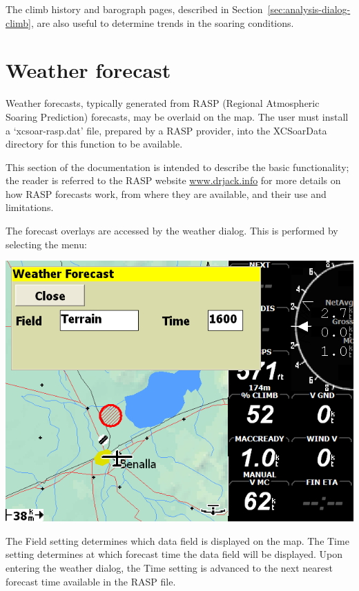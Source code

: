 \documentclass[a4paper,12pt]{refrep}
\begin{document}
The climb history and barograph pages, described in
Section~\ref{sec:analysis-dialog-climb}, are also useful to determine
trends in the soaring conditions.

\section{Weather forecast}

Weather forecasts, typically generated from RASP (Regional Atmospheric
Soaring Prediction) forecasts, may be overlaid on the map.  The user
must install a `xcsoar-rasp.dat' file, prepared by a RASP provider,
into the XCSoarData directory for this function to be available.

This section of the documentation is intended to describe the basic
functionality; the reader is referred to the RASP website
\url{www.drjack.info} for more details on how RASP forecasts work, from where they are available, and their use and limitations.

The forecast overlays are accessed by the weather dialog.  This is
performed by selecting the menu:
\begin{quote}
\blink{}\blink{}
\end{quote}

\begin{center}
\includegraphics[angle=0,width=\linewidth,keepaspectratio='true']{figures/dialog-weather.png}
\end{center}

The Field setting determines which data field is displayed on the map.
The Time setting determines at which forecast time the data field will
be displayed.  Upon entering the weather dialog, the Time setting is
advanced to the next nearest forecast time available in the RASP file.
\end{document}
